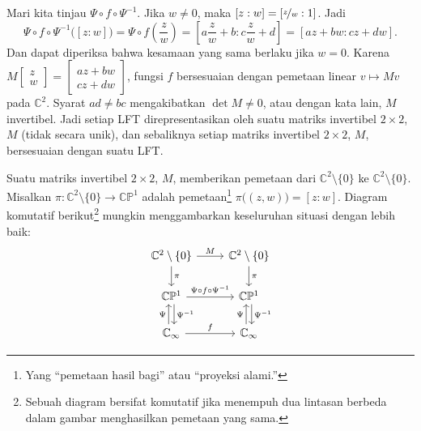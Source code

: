 \documentclass[12pt,openany]{book}
\newcommand{\C}{{\mathbb{C}}}
\newcommand{\bP}{{\mathbb{P}}}
\newcommand{\myquote}[1]{``#1''}
\theoremstyle{plain}
\theoremstyle{remark}
\theoremstyle{definition}
\theoremstyle{exercise}
\theoremstyle{example}
\begin{document}
Mari kita tinjau $\Psi \circ f \circ \Psi^{-1}$.
Jika $w \neq 0$, maka $[z:w] = [ \nicefrac{z}{w}:1 ]$.  Jadi
\begin{equation*}
\Psi \circ f \circ \Psi^{-1} \bigl([z:w]\bigr) =
\Psi \circ f \left(\frac{z}{w}\right) =
\left[a \frac{z}{w} + b : c \frac{z}{w} + d \right] =
\left[a z + b w: c z + d w \right] .
\end{equation*}
Dan dapat diperiksa bahwa kesamaan yang sama berlaku jika $w=0$.
Karena
$M \left[ \begin{smallmatrix} z \\ w \end{smallmatrix} \right]
= \left[ \begin{smallmatrix} 
a z + b w \\ c z + d w
\end{smallmatrix} \right]$,
fungsi $f$ bersesuaian dengan pemetaan linear $v \mapsto Mv$ pada $\C^2$.
Syarat $ad \neq bc$ mengakibatkan $\det M \neq 0$,
atau dengan kata lain, $M$ invertibel.
Jadi setiap LFT direpresentasikan oleh suatu matriks invertibel $2 \times 2$, $M$
(tidak secara unik), dan
sebaliknya setiap matriks invertibel $2 \times 2$, $M$, bersesuaian dengan suatu LFT\@.

Suatu matriks invertibel $2 \times 2$, $M$, memberikan pemetaan dari
$\C^2 \setminus \{ 0 \}$ ke $\C^2 \setminus \{ 0 \}$.
Misalkan $\pi \colon \C^2 \setminus \{ 0 \} \to \C \bP^1$ adalah pemetaan\footnote{Yang
\myquote{pemetaan hasil bagi} atau \myquote{proyeksi alami.}}
$\pi \bigl( (z,w) \bigr) =
[z:w]$.  Diagram komutatif berikut\footnote{Sebuah diagram bersifat
komutatif jika menempuh dua lintasan berbeda dalam gambar
menghasilkan pemetaan yang sama.}
mungkin
menggambarkan keseluruhan situasi dengan lebih baik:
\begin{equation*}
\begin{tikzcd}
\C^2 \setminus \{ 0 \} \arrow[r,"M"] \arrow[d,"\pi"] &
\C^2 \setminus \{ 0 \} \arrow[d,"\pi"] \\
\C \bP^1 \arrow[r,"\Psi \circ f \circ \Psi^{-1}"] \arrow[d,shift left,"\Psi^{-1}"] &
\C \bP^1 \arrow[d,shift left,"\Psi^{-1}"]
\\
\C_\infty \arrow[r,"f"]\arrow[u,shift left,"\Psi"] &
\C_\infty \arrow[u,shift left,"\Psi"]
\end{tikzcd}
\end{equation*}
\end{document}
